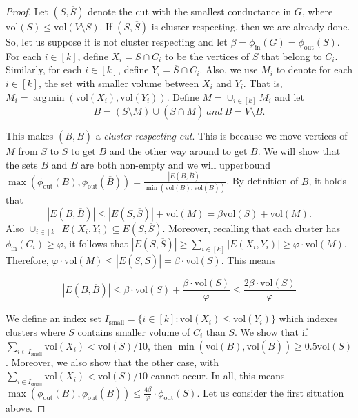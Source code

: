 \documentclass[letterpaper,11pt]{article}
\theoremstyle{plain}
\theoremstyle{definition}
\theoremstyle{remark}
\newcommand{\vol}{\text{vol}}
\DeclareMathOperator*{\argmin}{arg\,min}
\begin{document}
\begin{proof}
	Let $(S,\overline{S})$ denote the cut with the smallest conductance in $G$, 
	where  $\vol(S) \leq \vol(V \setminus S)$. If $(S, \overline{S})$ is cluster respecting, 
	then we are already done. So, let us suppose it is not cluster respecting and let 
	$\beta = \phi_{\text{in}}(G) = \phi_{\text{out}}(S)$.
	For each $i \in [k]$, define $X_i = S \cap C_i$ to be the vertices of $S$ that belong to $C_i$. Similarly, for each $i \in [k]$, define $Y_i = \overline{S} \cap C_i$.
	Also, we use $M_i$ to denote for each $i \in [k]$, the set with smaller volume between $X_i$ and $Y_i$.
	That is, $M_i = \argmin(\vol(X_i), \vol(Y_i))$. Define $M = \cup_{i \in [k]} M_i$ and let 
	$$B = (S \setminus M) \cup (\overline{S} \cap M) \ and \ \overline{B} = V \setminus B.$$
	
	This makes $(B, \overline{B})$ a \emph{cluster respecting cut}. This is because
	we move vertices of $M$ from $\overline{S}$ to $S$ to get $B$ and the other way around
	to get $\overline{B}$. We will show that the sets $B$ and $\overline{B}$ are both non-empty 
	and we will upperbound 
	$\max(\phi_{\text{out}}(B), \phi_{\text{out}}(\overline{B})) = \displaystyle\frac{|E(B, \overline{B})|}{\min(\vol(B), \vol(\overline{B}))}$. 
	By definition of $B$, it holds that
	$$|E(B, \overline{B})| \leq |E(S, \overline{S})| + \vol(M) = \beta \vol(S) + \vol(M).$$
	Also $\cup_{i \in [k]} E(X_i, Y_i) \subseteq E(S, \overline{S})$. Moreover, recalling that
	each cluster has $\phi_{\text{in}}(C_i) \geq \varphi$, it follows that 
	$|E(S, \overline{S})| \geq \sum_{i \in [k]} |E(X_i, Y_i)| \geq \varphi \cdot \vol(M).$ 
	Therefore, $\varphi \cdot \vol(M) \leq |E(S, \overline{S})| = \beta \cdot \vol(S)$. This means

	\begin{equation} \label{eq:edge-bound}
		|E(B, \overline{B})| \leq \beta \cdot \vol(S) + \frac{\beta \cdot \vol(S)}{\varphi} \leq \frac{2 \beta \cdot \vol(S)}{\varphi}
	\end{equation}

	We define an index set
	$I_{\text{small}} = \{i \in [k]: \vol(X_i) \leq \vol(Y_i) \}$ which indexes clusters where $S$ contains smaller volume
	of $C_i$ than $\overline{S}$. We show that if $\sum_{i \in I_{\text{small}}}\vol(X_i) < \vol(S)/10$, 
	then $\min(\vol(B), \vol(\overline{B})) \geq 0.5 \vol(S)$. Moreover, we also show that the
	other case, with $\sum_{i \in I_{\text{small}}}\vol(X_i) < \vol(S)/10$ cannot occur. In all, this
	means $\max(\phi_{\text{out}}(B), \phi_{\text{out}}(\overline{B})) \leq \frac{4 \beta}{\varphi} \cdot \phi_{\text{out}}(S)$. 
		Let us consider the first situation above.


\end{proof}
\end{document}
